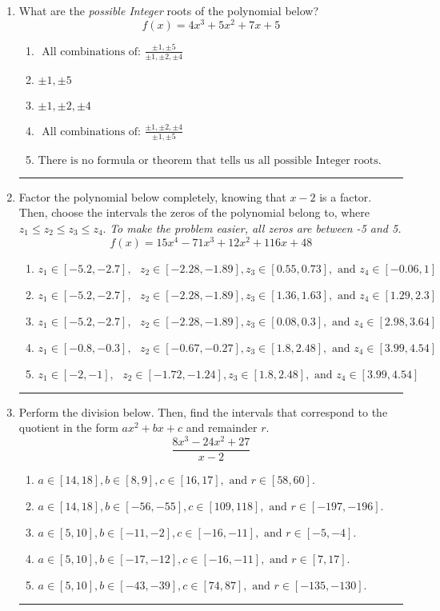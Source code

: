 \documentclass[14pt]{extbook}
\newcommand{\litem}[1]{\item#1\hspace*{-1cm}\rule{\textwidth}{0.4pt}}
\begin{document}
\begin{enumerate}
{\begin{enumerate}[label=\Alph*.]
\end{enumerate} }
\litem{
What are the \textit{possible Integer} roots of the polynomial below?\[ f(x) = 4x^{3} +5 x^{2} +7 x + 5 \]\begin{enumerate}[label=\Alph*.]
\item \( \text{ All combinations of: }\frac{\pm 1,\pm 5}{\pm 1,\pm 2,\pm 4} \)
\item \( \pm 1,\pm 5 \)
\item \( \pm 1,\pm 2,\pm 4 \)
\item \( \text{ All combinations of: }\frac{\pm 1,\pm 2,\pm 4}{\pm 1,\pm 5} \)
\item \( \text{There is no formula or theorem that tells us all possible Integer roots.} \)

\end{enumerate} }
\litem{
Factor the polynomial below completely, knowing that $x -2$ is a factor. Then, choose the intervals the zeros of the polynomial belong to, where $z_1 \leq z_2 \leq z_3 \leq z_4$. \textit{To make the problem easier, all zeros are between -5 and 5.}\[ f(x) = 15x^{4} -71 x^{3} +12 x^{2} +116 x + 48 \]\begin{enumerate}[label=\Alph*.]
\item \( z_1 \in [-5.2, -2.7], \text{   }  z_2 \in [-2.28, -1.89], z_3 \in [0.55, 0.73], \text{   and   } z_4 \in [-0.06, 1] \)
\item \( z_1 \in [-5.2, -2.7], \text{   }  z_2 \in [-2.28, -1.89], z_3 \in [1.36, 1.63], \text{   and   } z_4 \in [1.29, 2.3] \)
\item \( z_1 \in [-5.2, -2.7], \text{   }  z_2 \in [-2.28, -1.89], z_3 \in [0.08, 0.3], \text{   and   } z_4 \in [2.98, 3.64] \)
\item \( z_1 \in [-0.8, -0.3], \text{   }  z_2 \in [-0.67, -0.27], z_3 \in [1.8, 2.48], \text{   and   } z_4 \in [3.99, 4.54] \)
\item \( z_1 \in [-2, -1], \text{   }  z_2 \in [-1.72, -1.24], z_3 \in [1.8, 2.48], \text{   and   } z_4 \in [3.99, 4.54] \)

\end{enumerate} }
\litem{
Perform the division below. Then, find the intervals that correspond to the quotient in the form $ax^2+bx+c$ and remainder $r$.\[ \frac{8x^{3} -24 x^{2} + 27}{x -2} \]\begin{enumerate}[label=\Alph*.]
\item \( a \in [14, 18], b \in [8, 9], c \in [16, 17], \text{ and } r \in [58, 60]. \)
\item \( a \in [14, 18], b \in [-56, -55], c \in [109, 118], \text{ and } r \in [-197, -196]. \)
\item \( a \in [5, 10], b \in [-11, -2], c \in [-16, -11], \text{ and } r \in [-5, -4]. \)
\item \( a \in [5, 10], b \in [-17, -12], c \in [-16, -11], \text{ and } r \in [7, 17]. \)
\item \( a \in [5, 10], b \in [-43, -39], c \in [74, 87], \text{ and } r \in [-135, -130]. \)


\end{enumerate}}
\end{enumerate}
\end{document}
